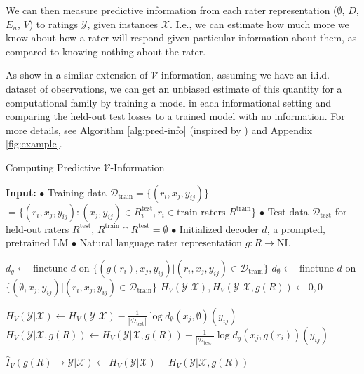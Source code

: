 \documentclass[11pt]{article}
\begin{document}
We can then measure predictive information from each rater representation ($\emptyset$, $D$, $E_n$, $V$) to ratings $\mathcal{Y}$, given instances $\mathcal{X}$. I.e., we can estimate how much more we know about how a rater will respond given particular information about them, as compared to knowing nothing about the rater.

As \citet{ethayarajh2022understandingdatasetdifficultymathcalvusable} show in a similar extension of $\mathcal{V}$-information, assuming we have an i.i.d. dataset of observations, we can get an unbiased estimate of this quantity for a computational family by training a model in each informational setting and comparing the held-out test losses to a trained model with no information. For more details, see Algorithm \ref{alg:pred-info} (inspired by \citet{ethayarajh2022understandingdatasetdifficultymathcalvusable}) and Appendix \ref{fig:example}.

\begin{algorithm}[H]
\begin{algorithmic}[0]
\caption{Computing Predictive $\mathcal{V}$-Information}
\small
\label{alg:pred-info}
\State \textbf{Input:}
\State $\bullet$ Training data $\mathcal{D}_\text{train} = \{(r_i, x_j, y_{ij})\}$
$= \{(r_i,x_j,y_{ij}): (x_j,y_{ij}) \in R_i^\text{test}, r_i \in \text{train raters } R^\text{train}\}$
\State $\bullet$ Test data $\mathcal{D}_\text{test}$ for held-out raters $R^\text{test}$, $R^\text{train} \cap R^\text{test} = \emptyset$
\State $\bullet$ Initialized decoder $d$, a prompted, pretrained LM
\State $\bullet$ Natural language rater representation $g: R \to \text{NL}$

\medskip
\State $d_g \gets$ finetune $d$ on $\{(g(r_i), x_j, y_{ij}) | (r_i,x_j,y_{ij}) \in \mathcal{D}_\text{train}\}$
\State $d_\emptyset \gets$ finetune $d$ on $\{(\emptyset, x_j, y_{ij}) | (r_i,x_j,y_{ij}) \in \mathcal{D}_\text{train}\}$
\State $H_V(\mathcal{Y}|\mathcal{X}), H_V(\mathcal{Y}|\mathcal{X},g(R)) \gets 0, 0$

\State $H_V(\mathcal{Y}|\mathcal{X}) \gets H_V(\mathcal{Y}|\mathcal{X}) - \frac{1}{|\mathcal{D}_\text{test}|} \log d_\emptyset(x_j, \emptyset)(y_{ij})$
\State $H_V(\mathcal{Y}|\mathcal{X},g(R)) \gets H_V(\mathcal{Y}|\mathcal{X},g(R)) - \frac{1}{|\mathcal{D}_\text{test}|} \log d_g(x_j, g(r_i))(y_{ij})$
\EndFor

\State $\hat{I}_V(g(R) \to \mathcal{Y}|\mathcal{X}) \gets H_V(\mathcal{Y}|\mathcal{X}) - H_V(\mathcal{Y}|\mathcal{X},g(R))$
\end{algorithmic}
\end{algorithm}
\vspace{-10pt}
\end{document}
